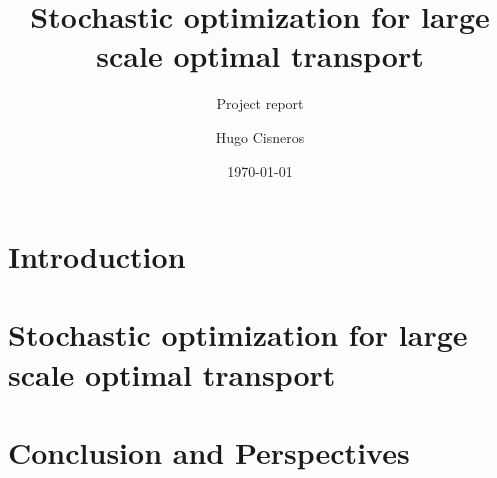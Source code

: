 \documentclass[12pt,a4paper]{scrartcl} %
\title{Stochastic optimization for large scale optimal transport}
\author{Hugo Cisneros}
\date{\today} %
\subtitle{Project report}
\begin{document}
\maketitle
{}
\clearpage
\tableofcontents %

\clearpage

\section{Introduction}
\section{Stochastic optimization for large scale optimal transport}
\section{Conclusion and Perspectives}
\end{document}
